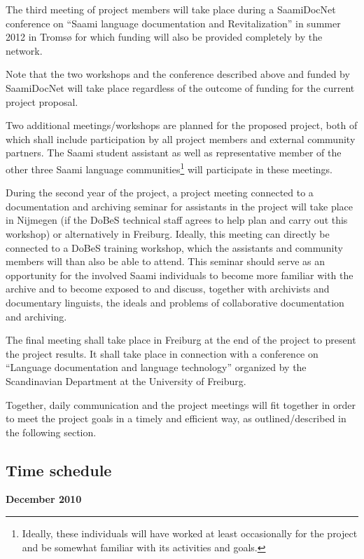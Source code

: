 \documentclass[a4paper,12pt]{article}
\begin{document}
{{The third meeting of project members will take place during a SaamiDocNet conference on “Saami language documentation and Revitalization” in summer 2012 in Tromsø for which funding will also be provided completely by the network.

Note that the two workshops and the conference described above and funded by SaamiDocNet will take place regardless of the outcome of funding for the current project proposal.

Two additional meetings/workshops are planned for the proposed project, both of which shall include participation by all project members and external community partners. The Saami student assistant as well as representative member of the other three Saami language communities\footnote{Ideally, these individuals will have worked at least occasionally for the project and be somewhat familiar with its activities and goals.} will participate in these meetings. 

During the second year of the project, a project meeting connected to a documentation and archiving seminar for assistants in the project will take place in Nijmegen (if the DoBeS technical staff agrees to help plan and carry out this workshop) or alternatively in Freiburg. Ideally, this meeting can directly be connected to a DoBeS training workshop, which the assistants and community members will than also be able to attend. This seminar should serve as an opportunity for the involved Saami individuals to become more familiar with the archive and to become exposed to and discuss, together with archivists and documentary linguists, the ideals and problems of collaborative documentation and archiving.

The final meeting shall take place in Freiburg at the end of the project to present the project results. It shall take place in connection with a conference on “Language documentation and language technology” organized by the Scandinavian Department at the University of Freiburg.

Together, daily communication and the project meetings will fit together in order to meet the project goals in a timely and efficient way, as outlined/described in the following section.

\subsection{Time schedule}
\begin{flushleft}
\noindent \textbf{December 2010}


\end{flushleft}}}
\end{document}

